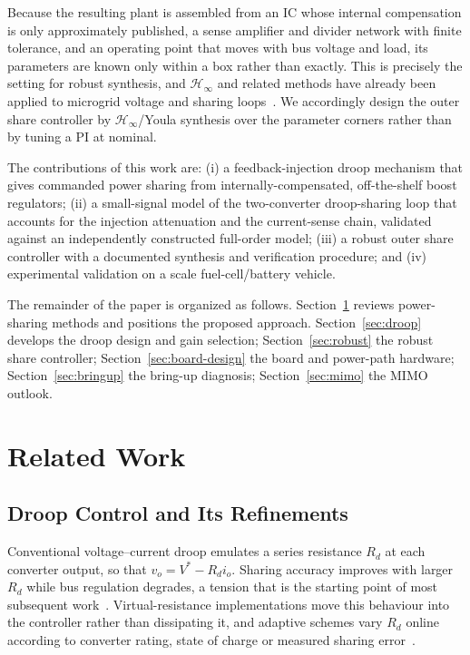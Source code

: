 Because the resulting plant is assembled from an IC whose internal compensation
is only approximately published, a sense amplifier and divider network with
finite tolerance, and an operating point that moves with bus voltage and load,
its parameters are known only within a box rather than exactly. This is precisely
the setting for robust synthesis, and $\mathcal{H}_\infty$ and related methods
have already been applied to microgrid voltage and sharing
loops~\cite{sedhom2019hinf,hosseinzadeh2024robust,mirjafari2022robust}. We
accordingly design the outer share controller by $\mathcal{H}_\infty$/Youla
synthesis over the parameter corners rather than by tuning a PI at nominal.

The contributions of this work are: (i) a feedback-injection droop mechanism
that gives commanded power sharing from internally-compensated, off-the-shelf
boost regulators; (ii) a small-signal model of the two-converter droop-sharing
loop that accounts for the injection attenuation and the current-sense chain,
validated against an independently constructed full-order model; (iii) a robust
outer share controller with a documented synthesis and verification procedure;
and (iv) experimental validation on a scale fuel-cell/battery vehicle.

The remainder of the paper is organized as follows. Section~\ref{sec:related}
reviews power-sharing methods and positions the proposed approach.
Section~\ref{sec:droop} develops the droop design and gain selection;
Section~\ref{sec:robust} the robust share controller; Section~\ref{sec:board-design}
the board and power-path hardware; Section~\ref{sec:bringup} the bring-up
diagnosis; Section~\ref{sec:mimo} the MIMO outlook.

\section{Related Work}
\label{sec:related}

\subsection{Droop Control and Its Refinements}

Conventional voltage--current droop emulates a series resistance $R_d$ at each
converter output, so that $v_o = V^\ast - R_d i_o$. Sharing accuracy improves
with larger $R_d$ while bus regulation degrades, a tension that is the
starting point of most subsequent work~\cite{dragicevic2016part1,gao2018primary}.
Virtual-resistance implementations move this behaviour into the controller rather
than dissipating it, and adaptive schemes vary $R_d$ online according to
converter rating, state of charge or measured sharing
error~\cite{tah2016adaptive,lu2014adaptive,khorsandi2024adaptive}.

